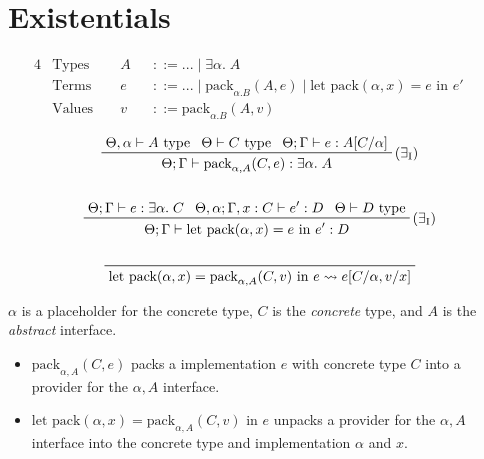\documentclass[a4paper,11pt]{article}
\begin{document}
\section{Existentials}
{

    \begin{alignat*}{4}
    &\text{Types } &&A &&::= ... \mid \exists\alpha.\;A && \\
    &\text{Terms } &&e &&::= ... \mid \text{pack}_{\alpha.B}(A,e) \mid \text{let pack}(\alpha,x) = e\text{ in }e' && \\
    &\text{Values } &&v &&::= \text{pack}_{\alpha.B}(A,v) &&
    \end{alignat*}

    \begin{gather*}
    \prftree[r]{(\(\exists_\text{I}\))}
    {\Theta,\alpha\vdash A\text{ type}}
    {\Theta\vdash C\text{ type}}
    {\Theta;\Gamma\vdash e:A[C/\alpha]}
    {\Theta;\Gamma\vdash \text{pack}_{\alpha,A}(C,e) : \exists\alpha.\;A}
    \\
    \\
    \prftree[r]{(\(\exists_\text{I}\))}
    {\Theta;\Gamma\vdash e:\exists\alpha.\;C}
    {\Theta,\alpha;\Gamma,x:C \vdash e' : D}
    {\Theta\vdash D\text{ type}}
    {\Theta;\Gamma\vdash \text{let pack}(\alpha,x) = e\text{ in }e':D}
    \\
    \\
    \prftree[r]{}
    {\text{let pack}(\alpha,x) = \text{pack}_{\alpha,A}(C,v) \text{ in } e \leadsto e[C/\alpha,v/x]}
    \end{gather*}

    \(\alpha\) is a placeholder for the concrete type, \(C\) is the \textit{concrete} type, and \(A\) is the
    \textit{abstract} interface.

    \begin{itemize}
    \item
    {

        \(\text{pack}_{\alpha,A}(C,e)\) packs a implementation \(e\) with concrete type \(C\) into a provider for the
        \(\alpha,A\) interface.

    }
    \item
    {

        \(\text{let pack}(\alpha, x) = \text{pack}_{\alpha,A}(C,v)\text{ in }e\) unpacks a provider for the \(\alpha,A\)
        interface into the concrete type and implementation \(\alpha\) and \(x\).

    }
    \end{itemize}

}
\end{document}
